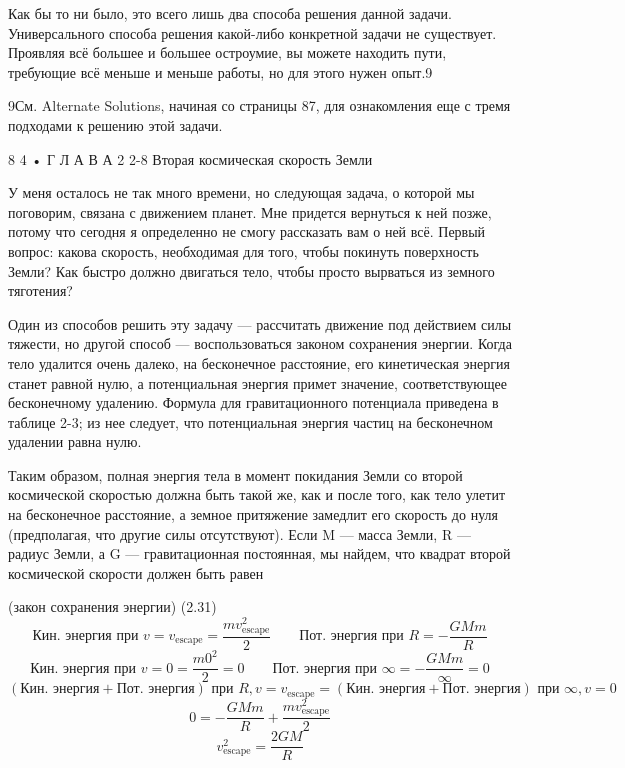 \documentclass[10pt,oneside]{article}
\begin{document}
Как бы то ни было, это всего лишь два способа решения данной задачи. Универсального способа решения какой-либо конкретной задачи не существует. Проявляя всё большее и большее остроумие, вы можете находить пути, требующие всё меньше и меньше работы, но для этого нужен опыт.9\par

9См. Alternate Solutions, начиная со страницы 87, для ознакомления еще с тремя подходами к решению этой задачи.\par

8 4 • Г Л А В А  2 2-8 Вторая космическая скорость Земли\par

У меня осталось не так много времени, но следующая задача, о которой мы поговорим, связана с движением планет. Мне придется вернуться к ней позже, потому что сегодня я определенно не смогу рассказать вам о ней всё. Первый вопрос: какова скорость, необходимая для того, чтобы покинуть поверхность Земли? Как быстро должно двигаться тело, чтобы просто вырваться из земного тяготения?\par

Один из способов решить эту задачу --- рассчитать движение под действием силы тяжести, но другой способ --- воспользоваться законом сохранения энергии. Когда тело удалится очень далеко, на бесконечное расстояние, его кинетическая энергия станет равной нулю, а потенциальная энергия примет значение, соответствующее бесконечному удалению. Формула для гравитационного потенциала приведена в таблице 2-3; из нее следует, что потенциальная энергия частиц на бесконечном удалении равна нулю.\par

Таким образом, полная энергия тела в момент покидания Земли со второй космической скоростью должна быть такой же, как и после того, как тело улетит на бесконечное расстояние, а земное притяжение замедлит его скорость до нуля (предполагая, что другие силы отсутствуют). Если M --- масса Земли, R --- радиус Земли, а G --- гравитационная постоянная, мы найдем, что квадрат второй космической скорости должен быть равен\par

(закон сохранения энергии) (2.31) \[\text{Кин. энергия при } v = v_{\text{escape}} = \frac{m v_{\text{escape}}^2}{2} \qquad \text{Пот. энергия при } R = -\frac{GMm}{R}\] \[\text{Кин. энергия при } v = 0 = \frac{m 0^2}{2} = 0 \qquad \text{Пот. энергия при } \infty = -\frac{GMm}{\infty} = 0\] \[(\text{Кин. энергия} + \text{Пот. энергия}) \text{ при } R, v = v_{\text{escape}} = (\text{Кин. энергия} + \text{Пот. энергия}) \text{ при } \infty, v = 0\] \[0 = -\frac{GMm}{R} + \frac{m v_{\text{escape}}^2}{2}\] \[v_{\text{escape}}^2 = \frac{2GM}{R}\]\par
\end{document}
